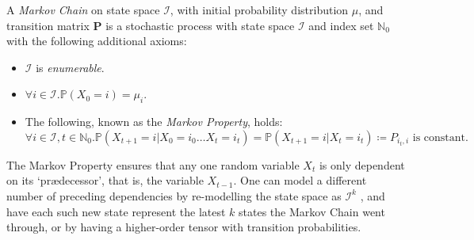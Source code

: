 	\begin{definition}
		A \emph{Markov Chain} on state space $\mathcal{I}$, with initial probability distribution 
		$\mu$, and transition matrix $\mathbf{P}$ is a stochastic process with state space $\mathcal{I}$ 
		and index set $\mathbb{N}_0$ with the following additional axioms:
		\begin{itemize}
			\item $\mathcal{I}$ is \emph{enumerable}.
			\item $\forall i \in \mathcal{I}. \mathbb{P}(X_0 = i) = \mu_i$.
			\item The following, known as the \emph{Markov Property}, holds:
			$$
				\forall i  \in \mathcal{I}, t \in \mathbb{N}_0. 
				\mathbb{P}(X_{t+1} = i | X_{0}= i_0 \hdots X_{t} = i_t) = 
				\mathbb{P}(X_{t+1} = i | X_t = i_t) \coloneqq P_{i_t, i} \text{ is constant.}
			$$
		\end{itemize}
	\end{definition}
	The Markov Property ensures that any one random variable $X_{t}$ is only dependent on its `prædecessor',
	that is, the variable $X_{t-1}$. One can model a different number of preceding dependencies 
	by re-modelling the state space as $\mathcal{I}^k$ , and have each such new state represent the latest 
	$k$ states the Markov Chain went through, or by having a higher-order tensor with transition
	probabilities.
	
